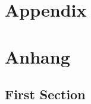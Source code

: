 

{\chapter{Appendix}}    %
{\chapter{Anhang}}      %
\label{chap:appendix}


\section{First Section}
\label{sec:appendix:FirstSection}

